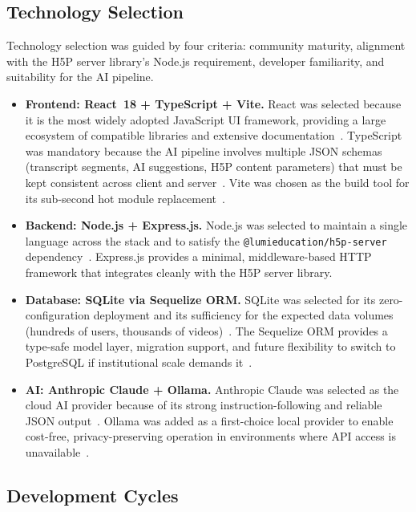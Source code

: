 \subsection{Technology Selection}

Technology selection was guided by four criteria: community maturity,
alignment with the H5P server library's Node.js requirement, developer
familiarity, and suitability for the AI pipeline.

\begin{itemize}
  \item \textbf{Frontend: React~18 + TypeScript + Vite.}
  React was selected because it is the most widely adopted JavaScript UI
  framework, providing a large ecosystem of compatible libraries and
  extensive documentation~\cite{react2023}. TypeScript was mandatory because
  the AI pipeline involves multiple JSON schemas (transcript segments,
  AI suggestions, H5P content parameters) that must be kept consistent
  across client and server~\cite{typescript2023}. Vite was chosen as the
  build tool for its sub-second hot module replacement~\cite{vite2023}.

  \item \textbf{Backend: Node.js + Express.js.}
  Node.js was selected to maintain a single language across the stack and to
  satisfy the \texttt{@lumieducation/h5p-server} dependency~\cite{nodejs2023,
  expressjs2023}. Express.js provides a minimal, middleware-based HTTP
  framework that integrates cleanly with the H5P server library.

  \item \textbf{Database: SQLite via Sequelize ORM.}
  SQLite was selected for its zero-configuration deployment and its
  sufficiency for the expected data volumes (hundreds of users, thousands
  of videos)~\cite{sqlite2023}. The Sequelize ORM provides a type-safe
  model layer, migration support, and future flexibility to switch to
  PostgreSQL if institutional scale demands it~\cite{sequelize2023}.

  \item \textbf{AI: Anthropic Claude + Ollama.}
  Anthropic Claude was selected as the cloud AI provider because of its
  strong instruction-following and reliable JSON output~\cite{anthropic2024}.
  Ollama was added as a first-choice local provider to enable cost-free,
  privacy-preserving operation in environments where API access is
  unavailable~\cite{brown2020}.
\end{itemize}

\subsection{Development Cycles}

